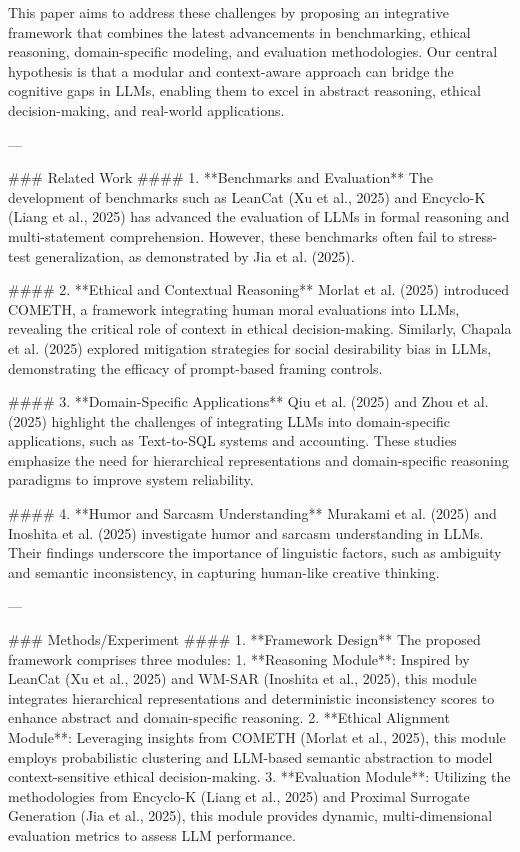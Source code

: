 This paper aims to address these challenges by proposing an integrative framework that combines the latest advancements in benchmarking, ethical reasoning, domain-specific modeling, and evaluation methodologies. Our central hypothesis is that a modular and context-aware approach can bridge the cognitive gaps in LLMs, enabling them to excel in abstract reasoning, ethical decision-making, and real-world applications.  

---

### Related Work  
#### 1. **Benchmarks and Evaluation**  
The development of benchmarks such as LeanCat (Xu et al., 2025) and Encyclo-K (Liang et al., 2025) has advanced the evaluation of LLMs in formal reasoning and multi-statement comprehension. However, these benchmarks often fail to stress-test generalization, as demonstrated by Jia et al. (2025).  

#### 2. **Ethical and Contextual Reasoning**  
Morlat et al. (2025) introduced COMETH, a framework integrating human moral evaluations into LLMs, revealing the critical role of context in ethical decision-making. Similarly, Chapala et al. (2025) explored mitigation strategies for social desirability bias in LLMs, demonstrating the efficacy of prompt-based framing controls.  

#### 3. **Domain-Specific Applications**  
Qiu et al. (2025) and Zhou et al. (2025) highlight the challenges of integrating LLMs into domain-specific applications, such as Text-to-SQL systems and accounting. These studies emphasize the need for hierarchical representations and domain-specific reasoning paradigms to improve system reliability.  

#### 4. **Humor and Sarcasm Understanding**  
Murakami et al. (2025) and Inoshita et al. (2025) investigate humor and sarcasm understanding in LLMs. Their findings underscore the importance of linguistic factors, such as ambiguity and semantic inconsistency, in capturing human-like creative thinking.  

---

### Methods/Experiment  
#### 1. **Framework Design**  
The proposed framework comprises three modules:  
1. **Reasoning Module**: Inspired by LeanCat (Xu et al., 2025) and WM-SAR (Inoshita et al., 2025), this module integrates hierarchical representations and deterministic inconsistency scores to enhance abstract and domain-specific reasoning.  
2. **Ethical Alignment Module**: Leveraging insights from COMETH (Morlat et al., 2025), this module employs probabilistic clustering and LLM-based semantic abstraction to model context-sensitive ethical decision-making.  
3. **Evaluation Module**: Utilizing the methodologies from Encyclo-K (Liang et al., 2025) and Proximal Surrogate Generation (Jia et al., 2025), this module provides dynamic, multi-dimensional evaluation metrics to assess LLM performance.  

